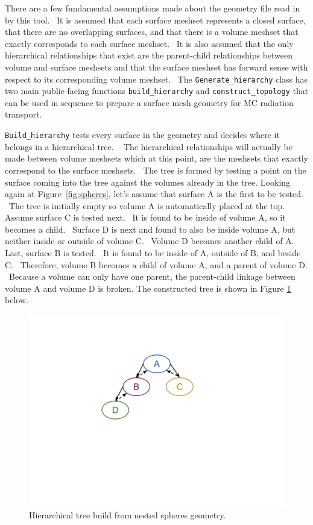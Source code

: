 There are a few fundamental assumptions made about the geometry file read in by this tool.  It is assumed 
that each surface meshset represents a closed surface, that there are no overlapping surfaces, and that there is a volume meshset that 
exactly corresponds to each surface meshset.  It is also assumed that the only hierarchical relationships that exist are the
parent-child relationships between volume and surface meshsets and that the surface 
meshset has forward sense with respect to its corresponding volume meshset.  The \texttt{Generate\_hierarchy} class
has two main public-facing functions \texttt{build\_hierarchy} and \texttt{construct\_topology} that can be used in sequence
to prepare a surface mesh geometry for MC radiation transport.  

\texttt{Build\_hierarchy} tests every surface in the geometry and decides where it belongs in a hierarchical tree.  
The hierarchical relationships will actually be made between volume meshsets which at this point, are the 
meshsets that exactly correspond to the surface meshsets.  The tree is formed by testing a point on the surface 
coming into the tree against the volumes already in the tree. Looking again at Figure~\ref{fig:spheres}, let’s assume that 
surface A is the first to be tested.  The tree is initially empty so volume A is automatically placed at the top.  
Assume surface C is tested next.  It is found to be inside of volume A, so it becomes a child.  Surface D is next 
and found to also be inside volume A, but neither inside or outside of volume C.  Volume D becomes another child of A.  
Last, surface B is tested.  It is found to be inside of A, outside of B, and beside C.  Therefore, volume B becomes a 
child of volume A, and a parent of volume D.  Because a volume can only have one parent, the parent-child linkage 
between volume A and volume D is broken.  The constructed tree is shown in Figure \ref{fig:tree} below.

\begin{figure}
 \begin{centering}
 \centering
 \includegraphics[width=\paperwidth]{../figs/tree.png}
 \caption{Hierarchical tree build from nested spheres geometry.}
 \label{fig:tree}
 \end{centering}
\end{figure}

